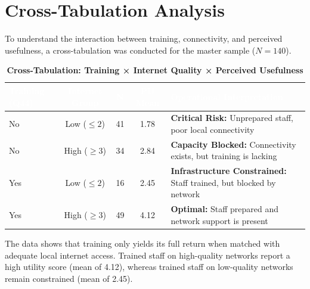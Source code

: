 \documentclass[10pt,a4paper]{article}
\begin{document}
\section{Cross-Tabulation Analysis}
To understand the interaction between training, connectivity, and perceived usefulness, a cross-tabulation was conducted for the master sample ($N=140$).

\begin{table}[h!]
\centering
\footnotesize
\caption{\textbf{Cross-Tabulation: Training × Internet Quality × Perceived Usefulness}}
\vspace{0.1cm}
\begin{tabularx}{\textwidth}{l c c c X}
\toprule
\rowcolor{navyblue}
\textcolor{white}{\textbf{Training (Q44)}} & \textcolor{white}{\textbf{Internet Group}} & \textcolor{white}{\textbf{N}} & \textcolor{white}{\textbf{PU Mean}} & \textcolor{white}{\textbf{Operational Interpretation}} \\
\midrule
No & Low ($\le 2$) & 41 & 1.78 & \textbf{Critical Risk:} Unprepared staff, poor local connectivity \\
No & High ($\ge 3$) & 34 & 2.84 & \textbf{Capacity Blocked:} Connectivity exists, but training is lacking \\
Yes & Low ($\le 2$) & 16 & 2.45 & \textbf{Infrastructure Constrained:} Staff trained, but blocked by network \\
Yes & High ($\ge 3$) & 49 & 4.12 & \textbf{Optimal:} Staff prepared and network support is present \\
\bottomrule
\end{tabularx}
\end{table}

The data shows that training only yields its full return when matched with adequate local internet access. Trained staff on high-quality networks report a high utility score (mean of 4.12), whereas trained staff on low-quality networks remain constrained (mean of 2.45).
\end{document}
